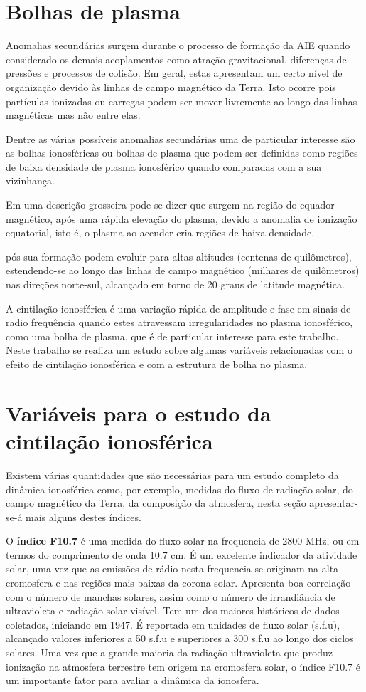 \section{Bolhas de plasma}

Anomalias secundárias surgem durante o processo de formação da AIE quando considerado os demais acoplamentos como atração gravitacional, diferenças de pressões e processos de colisão. Em geral, estas apresentam um certo nível de organização devido às linhas de campo magnético da Terra. Isto ocorre pois partículas ionizadas ou carregas podem ser mover livremente ao longo das linhas magnéticas mas não entre elas.

Dentre as várias possíveis anomalias secundárias uma de particular interesse são as bolhas ionosféricas ou bolhas de plasma que podem ser definidas como regiões de baixa densidade de plasma ionosférico quando comparadas com a sua vizinhança. 

Em uma descrição grosseira pode-se dizer que surgem na região do equador magnético, após uma rápida elevação do plasma, devido a anomalia de ionização equatorial, isto é, o plasma ao acender cria regiões de baixa densidade.

pós sua formação podem evoluir para altas altitudes (centenas de quilômetros), estendendo-se ao longo das linhas de campo magnético (milhares de quilômetros) nas direções norte-sul, alcançado em torno de 20 graus de latitude magnética.


A cintilação ionosférica é uma variação rápida de amplitude e fase em sinais de radio frequência quando estes atravessam irregularidades no plasma ionosférico, como uma bolha de plasma, que é de particular interesse para este trabalho. Neste trabalho se realiza um estudo sobre algumas variáveis relacionadas com o efeito de cintilação ionosférica e com a estrutura de bolha no plasma.

\section{Variáveis para o estudo da cintilação ionosférica}

Existem várias quantidades que são necessárias para um estudo completo da dinâmica ionosférica como, por exemplo, medidas do fluxo de radiação solar, do campo magnético da Terra, da composição da atmosfera, nesta seção apresentar-se-á mais alguns destes índices.

O {\bf índice F10.7} é uma medida do fluxo solar na frequencia de 2800 MHz, ou em termos do comprimento de onda 10.7 cm. É um excelente indicador da atividade solar, uma vez que as emissões de rádio nesta frequencia se originam na alta cromosfera e nas regiões mais baixas da corona solar. Apresenta boa correlação com o número de manchas solares, assim como o número de irrandiância de ultravioleta e radiação solar visível. Tem um dos maiores históricos de dados coletados, iniciando em 1947. É reportada em unidades de fluxo solar (s.f.u), alcançado valores inferiores a 50 s.f.u e superiores a 300 s.f.u ao longo dos ciclos solares. Uma vez que a grande maioria da radiação ultravioleta que produz ionização na atmosfera terrestre tem origem na cromosfera solar, o índice F10.7 é um importante fator para avaliar a dinâmica da ionosfera.

